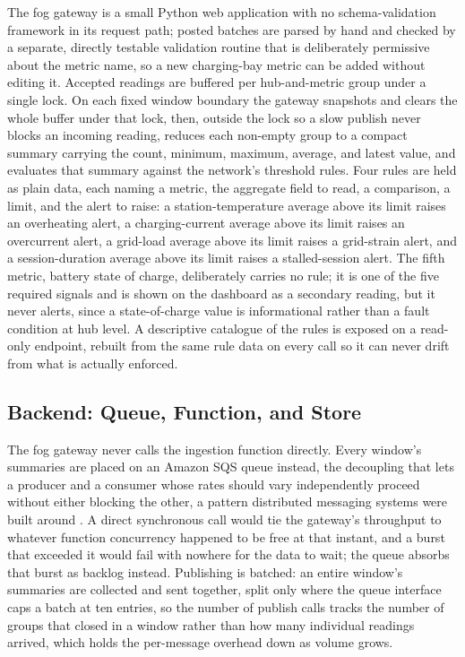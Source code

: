 \documentclass[conference]{IEEEtran}
\begin{document}
The fog gateway is a small Python web application with no schema-validation framework in its request path; posted batches are parsed by hand and checked by a separate, directly testable validation routine that is deliberately permissive about the metric name, so a new charging-bay metric can be added without editing it. Accepted readings are buffered per hub-and-metric group under a single lock. On each fixed window boundary the gateway snapshots and clears the whole buffer under that lock, then, outside the lock so a slow publish never blocks an incoming reading, reduces each non-empty group to a compact summary carrying the count, minimum, maximum, average, and latest value, and evaluates that summary against the network's threshold rules. Four rules are held as plain data, each naming a metric, the aggregate field to read, a comparison, a limit, and the alert to raise: a station-temperature average above its limit raises an overheating alert, a charging-current average above its limit raises an overcurrent alert, a grid-load average above its limit raises a grid-strain alert, and a session-duration average above its limit raises a stalled-session alert. The fifth metric, battery state of charge, deliberately carries no rule; it is one of the five required signals and is shown on the dashboard as a secondary reading, but it never alerts, since a state-of-charge value is informational rather than a fault condition at hub level. A descriptive catalogue of the rules is exposed on a read-only endpoint, rebuilt from the same rule data on every call so it can never drift from what is actually enforced.

\subsection{Backend: Queue, Function, and Store}

The fog gateway never calls the ingestion function directly. Every window's summaries are placed on an Amazon SQS queue instead, the decoupling that lets a producer and a consumer whose rates should vary independently proceed without either blocking the other, a pattern distributed messaging systems were built around \cite{ref6}. A direct synchronous call would tie the gateway's throughput to whatever function concurrency happened to be free at that instant, and a burst that exceeded it would fail with nowhere for the data to wait; the queue absorbs that burst as backlog instead. Publishing is batched: an entire window's summaries are collected and sent together, split only where the queue interface caps a batch at ten entries, so the number of publish calls tracks the number of groups that closed in a window rather than how many individual readings arrived, which holds the per-message overhead down as volume grows.
\end{document}
